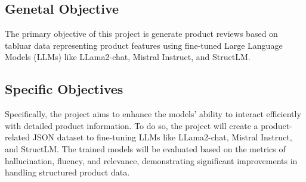\subsection*{Genetal Objective}
The primary objective of this project is generate product reviews based on tabluar data representing product features using fine-tuned Large Language Models (LLMs) like LLama2-chat, Mistral Instruct, and StructLM.
\subsection*{Specific Objectives}
Specifically, the project aims to enhance the models' ability to interact efficiently with detailed product information. To do so, the project will create a product-related JSON dataset to fine-tuning LLMs like LLama2-chat, Mistral Instruct, and StructLM. The trained models will be evaluated based on the metrics of hallucination, fluency, and relevance, demonstrating significant improvements in handling structured product data.